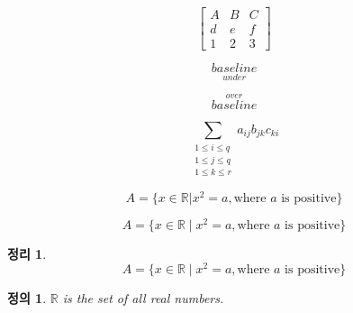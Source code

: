 \documentclass{oblivoir}
\newtheorem*{thm}{정리}
\newtheorem*{defn}{정의}
\begin{document}
\[\begin{bmatrix}
A & B & C \\
d & e & f \\
1 & 2 & 3
\end{bmatrix}
\]

\[ \underset{under}{baseline} \]

\[ \overset{over}{baseline} \]

\[\sum_{\substack{1 \leq i \leq  q\\
1 \leq j \leq q \\
1 \leq k \leq r}
} a_{ij} b_{jk} c_{ki}
\]

\[ A=\{ x \in \mathbb{R} | x^2=a, \text{where $a$ is positive}\} \]

\[ A=\{ x \in \mathbb{R} \mid x^2=a, \text{where $a$ is positive} \} \]

\begin{thm}
\[ A=\{ x \in \mathbb{R} \mid x^2=a, \text{where $a$ is positive} \} \]
\end{thm}

\begin{defn}
$\mathbb{R}$ is the set of all real numbers.
\end{defn}
\end{document}
